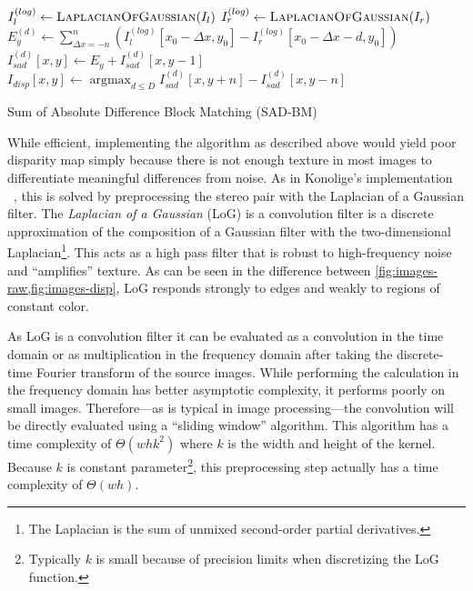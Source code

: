 \documentclass{article}
\let\orgautoref\autoref
\providecommand{\Cref}
        {\def\equationautorefname{Equation}%
         \def\figureautorefname{Figure}%
         \def\subfigureautorefname{Figure}%
         \def\Itemautorefname{Item}%
         \def\tableautorefname{Table}%
         \def\sectionautorefname{Section}%
         \def\subsectionautorefname{Section}%
         \def\subsubsectionautorefname{Section}%
         \def\chapterautorefname{Section}%
         \def\partautorefname{Part}%
         \orgautoref}
\newcommand{\proc}[1]{\textnormal{\scshape#1}}
\DeclareMathOperator*{\argmin}{argmax}
\DeclareMathOperator{\LoG}{\proc{LaplacianOfGaussian}}
\begin{document}
\begin{algorithm}[t]
    $I_l^{(log)} \gets \LoG(I_l)$ \;
    $I_r^{(log)} \gets \LoG(I_r)$ \;
     {
         {
            $E_y^{(d)} \gets \sum_{\Delta x = -n}^n \left(
                          I_l^{(log)}[x_0 - \Delta x, y_0]
                          - I_r^{(log)}[x_0 - \Delta x - d, y_0] \right)$ \;
            $I_{sad}^{(d)}[x, y] \gets E_y + I_{sad}^{(d)}[x, y - 1]$ \;
        }
    }
     {
        $I_{disp}[x, y] \gets \argmin_{d \le D} I_{sad}^{(d)}[x, y + n] - I_{sad}^{(d)}[x, y - n]$ \;
    }
    \caption{Sum of Absolute Difference Block Matching (SAD-BM)}
    \label{alg:serial}
\end{algorithm}

While efficient, implementing the algorithm as described above would yield poor
disparity map simply because there is not enough texture in most images to
differentiate meaningful differences from noise. As in Konolige's
implementation ~\cite{konolige97}, this is solved by preprocessing the stereo
pair with the Laplacian of a Gaussian filter. The \textit{Laplacian of a
Gaussian} (LoG) is a convolution filter is a discrete approximation of the
composition of a Gaussian filter with the two-dimensional
Laplacian\footnote{The Laplacian is the sum of unmixed second-order partial
derivatives.}. This acts as a high pass filter that is robust to high-frequency
noise and ``amplifies'' texture. As can be seen in the difference between
\Cref{fig:images-raw,fig:images-disp}, LoG responds strongly to edges and
weakly to regions of constant color.

As LoG is a convolution filter it can be evaluated as a convolution in the time
domain or as multiplication in the frequency domain after taking the
discrete-time Fourier transform of the source images. While performing the
calculation in the frequency domain has better asymptotic complexity, it
performs poorly on small images. Therefore---as is typical in image
processing---the convolution will be directly evaluated using a ``sliding
window'' algorithm. This algorithm has a time complexity of $\Theta(whk^2)$
where $k$ is the width and height of the kernel. Because $k$ is constant
parameter\footnote{Typically $k$ is small because of precision limits when
discretizing the LoG function.}, this preprocessing step actually has a time
complexity of $\Theta(wh)$.
\end{document}
